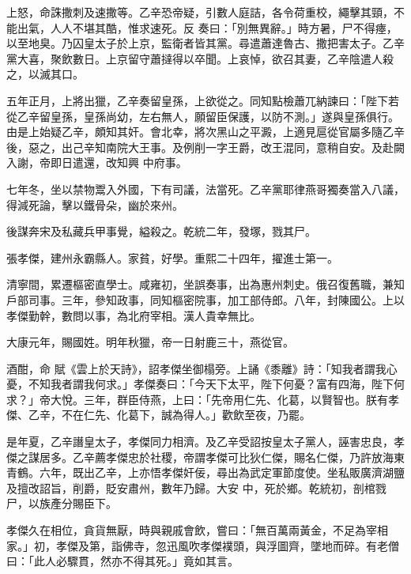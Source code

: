 \begin{pinyinscope}
 上怒，命誅撒刺及速撒等。乙辛恐帝疑，引數人庭詰，各令荷重校，繩擊其頸，不能出氣，人人不堪其酷，惟求速死。反
 奏曰：「別無異辭。」時方暑，尸不得瘞，以至地臭。乃囚皇太子於上京，監衛者皆其黨。尋遣蕭達魯古、撒把害太子。乙辛黨大喜，聚飲數日。上京留守蕭撻得以卒聞。上哀悼，欲召其妻，乙辛陰遣人殺之，以滅其口。



 五年正月，上將出獵，乙辛奏留皇孫，上欲從之。同知點檢蕭兀納諫曰：「陛下若從乙辛留皇孫，皇孫尚幼，左右無人，願留臣保護，以防不測。」遂與皇孫俱行。由是上始疑乙辛，頗知其奸。會北幸，將次黑山之平澱，上適見扈從官屬多隨乙辛後，惡之，出己辛知南院大王事。及例削一字王爵，改王混同，意稍自安。及赴闕入謝，帝即日遣還，改知興
 中府事。



 七年冬，坐以禁物鬻入外國，下有司議，法當死。乙辛黨耶律燕哥獨奏當入八議，得減死論，擊以鐵骨朵，幽於來州。



 後謀奔宋及私藏兵甲事覺，縊殺之。乾統二年，發塚，戮其尸。



 張孝傑，建州永霸縣人。家貧，好學。重熙二十四年，擢進士第一。



 清寧間，累遷樞密直學士。咸雍初，坐誤奏事，出為惠州刺史。俄召復舊職，兼知戶部司事。三年，參知政事，同知樞密院事，加工部侍郎。八年，封陳國公。上以孝傑勤幹，數問以事，為北府宰相。漢人貴幸無比。



 大康元年，賜國姓。明年秋獵，帝一日射鹿三十，燕從官。



 酒酣，命
 賦《雲上於天詩》，詔孝傑坐御榻旁。上誦《黍離》詩：「知我者謂我心憂，不知我者謂我何求。」孝傑奏曰：「今天下太平，陛下何憂？富有四海，陛下何求？」帝大悅。三年，群臣侍燕，上曰：「先帝用仁先、化葛，以賢智也。朕有孝傑、乙辛，不在仁先、化葛下，誠為得人。」歡飲至夜，乃罷。



 是年夏，乙辛譖皇太子，孝傑同力相濟。及乙辛受詔按皇太子黨人，誣害忠良，孝傑之謀居多。乙辛薦孝傑忠於社稷，帝謂孝傑可比狄仁傑，賜名仁傑，乃許放海東青鶴。六年，既出乙辛，上亦悟孝傑奸佞，尋出為武定軍節度使。坐私販廣濟湖鹽及擅改詔旨，削爵，貶安肅州，數年乃歸。大安
 中，死於鄉。乾統初，剖棺戮尸，以族產分賜臣下。



 孝傑久在相位，貪貨無厭，時與親戚會飲，嘗曰：「無百萬兩黃金，不足為宰相家。」初，孝傑及第，詣佛寺，忽迅風吹孝傑襆頭，與浮圖齊，墜地而碎。有老僧曰：「此人必驟貫，然亦不得其死。」竟如其言。




\end{pinyinscope}
